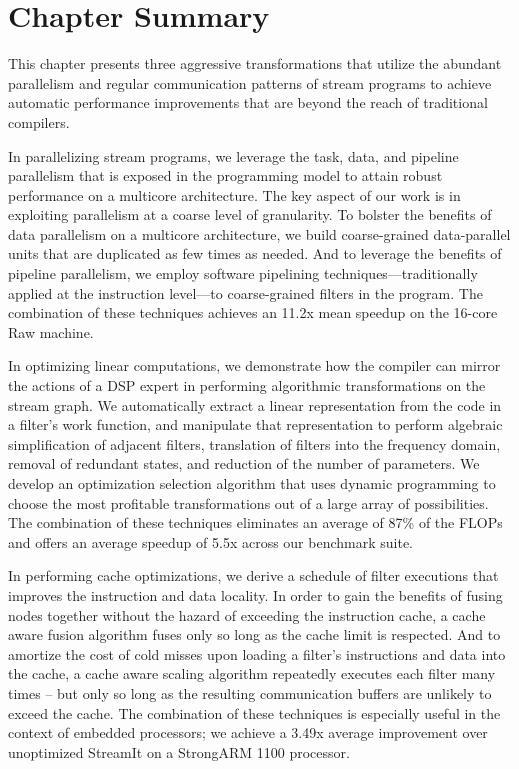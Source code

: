 \section{Chapter Summary}

This chapter presents three aggressive transformations that utilize
the abundant parallelism and regular communication patterns of stream
programs to achieve automatic performance improvements that are beyond
the reach of traditional compilers.

In parallelizing stream programs, we leverage the task, data, and
pipeline parallelism that is exposed in the programming model to
attain robust performance on a multicore architecture.  The key aspect
of our work is in exploiting parallelism at a coarse level of
granularity.  To bolster the benefits of data parallelism on a
multicore architecture, we build coarse-grained data-parallel units
that are duplicated as few times as needed.  And to leverage the
benefits of pipeline parallelism, we employ software pipelining
techniques---traditionally applied at the instruction level---to
coarse-grained filters in the program.  The combination of these
techniques achieves an 11.2x mean speedup on the 16-core Raw machine.

In optimizing linear computations, we demonstrate how the compiler can
mirror the actions of a DSP expert in performing algorithmic
transformations on the stream graph.  We automatically extract a
linear representation from the code in a filter's work function, and
manipulate that representation to perform algebraic simplification of
adjacent filters, translation of filters into the frequency domain,
removal of redundant states, and reduction of the number of
parameters.  We develop an optimization selection algorithm that uses
dynamic programming to choose the most profitable transformations out
of a large array of possibilities.  The combination of these
techniques eliminates an average of 87\% of the FLOPs and offers an
average speedup of 5.5x across our benchmark suite.

In performing cache optimizations, we derive a schedule of filter
executions that improves the instruction and data locality.  In order
to gain the benefits of fusing nodes together without the hazard of
exceeding the instruction cache, a cache aware fusion algorithm fuses
only so long as the cache limit is respected.  And to amortize the
cost of cold misses upon loading a filter's instructions and data into
the cache, a cache aware scaling algorithm repeatedly executes each
filter many times -- but only so long as the resulting communication
buffers are unlikely to exceed the cache.  The combination of these
techniques is especially useful in the context of embedded processors;
we achieve a 3.49x average improvement over unoptimized StreamIt on a
StrongARM 1100 processor.

